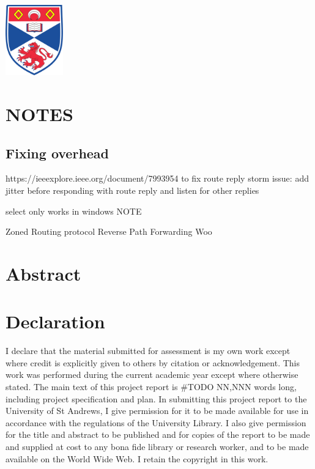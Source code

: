 \documentclass[12pt]{article}
\begin{document}
\begin{titlepage}
\includegraphics[width = 2.5cm]{images/standrewslogo.png}
 

\vfill %

\end{titlepage}


\section{NOTES}

\subsection{Fixing overhead}

https://ieeexplore.ieee.org/document/7993954 to fix route reply storm issue: add jitter before responding with route reply and listen for other replies

select only works in windows NOTE

Zoned Routing protocol 
Reverse Path Forwarding
Woo

\section*{Abstract}

\section*{Declaration}
I declare that the material submitted for
assessment is my own work except where credit is
explicitly given to others by citation or
acknowledgement. This work was performed during
the current academic year except where otherwise
stated.
The main text of this project report is \#TODO NN,NNN
words long, including project specification and plan.
In submitting this project report to the University of
St Andrews, I give permission for it to be made
available for use in accordance with the regulations of
the University Library. I also give permission for
the title and abstract to be published and for copies of
the report to be made and supplied at cost to any bona
fide library or research worker, and to be made
available on the World Wide Web. I retain the
copyright in this work.
\end{document}
